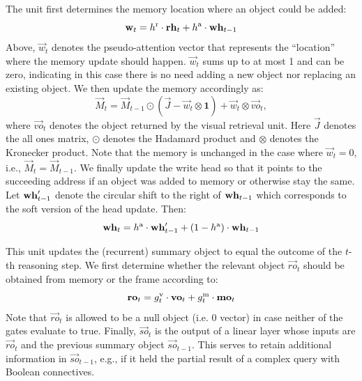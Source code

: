 The unit first determines the memory location where an object could be added:
\[ \mathbf{w}_t = h^{\mathrm{r}} \cdot \mathbf{rh}_t + h^{\mathrm{a}} \cdot \mathbf{wh}_{t-1} \]
Above, $\vec{w}_t$ denotes the pseudo-attention vector that represents the ``location'' where the memory update should happen.
$\vec{w}_t$ sums up to at most 1 and can be zero, indicating in this case there is no need adding a new object nor replacing an existing object.
We then update the memory accordingly as:
\[ \vec{M}_t = \vec{M}_{t-1} \odot (\vec{J} - \vec{w}_t  \otimes \mathbf{1}) + \vec{w}_t  \otimes \vec{vo}_t,\]
where $\vec{vo}_t$ denotes the object returned by the visual retrieval unit. 
Here $\vec{J}$ denotes the all ones matrix, $\odot$ denotes the Hadamard product and $\otimes$ denotes the Kronecker product. 
Note that the memory is unchanged in the case where $\vec{w}_t = 0$, i.e., $\vec{M}_t = \vec{M}_{t-1}$.
We finally update the write head so that it points to the succeeding address if an object was added to memory or otherwise stay the same.
Let $\mathbf{wh}'_{t-1}$ denote the circular shift to the right of $\mathbf{wh}_{t-1}$ which corresponds to the soft version of the head update.
Then:
\[ \mathbf{wh}_t = h^{\mathrm{a}} \cdot \mathbf{wh}'_{t-1} + (1-h^{\mathrm{a}}) \cdot \mathbf{wh}_{t-1} \]

This unit updates the (recurrent) summary object to equal the outcome of the $t$-th reasoning step.
We first determine whether the relevant object $\vec{ro}_t$ should be obtained from memory or the frame according to:
\[ \mathbf{ro}_t = g^{\mathrm{v}}_t \cdot \mathbf{vo}_t + g^{\mathrm{m}}_t \cdot \mathbf{mo}_t \]
Note that $\vec{ro}_t$ is allowed to be a null object (i.e. 0 vector) in case neither of the gates evaluate to true.
Finally, $\vec{so}_t$ is the output of a linear layer whose inputs are $\vec{ro}_t$ and the previous summary object $\vec{so}_{t-1}$.
This serves to retain additional information in $\vec{so}_{t-1}$, e.g., if it held the partial result of a complex query with Boolean connectives.


